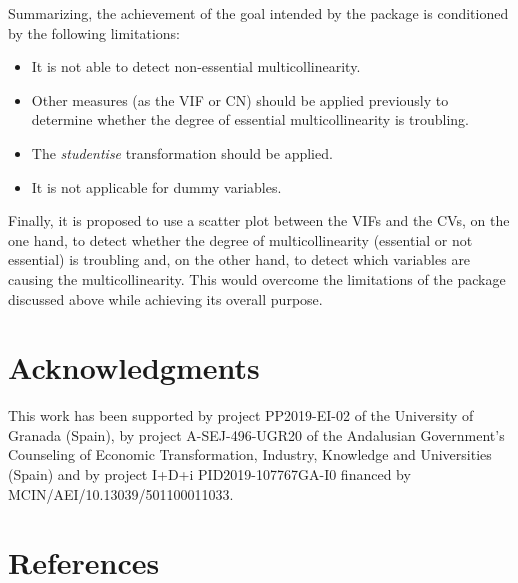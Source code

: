 Summarizing, the achievement of the goal intended by the  package is conditioned by the following limitations:

\begin{itemize}
\tightlist
\item
  It is not able to detect non-essential multicollinearity.
\item
  Other measures (as the VIF or CN) should be applied previously to determine whether the degree of essential multicollinearity is troubling.
\item
  The \emph{studentise} transformation should be applied.
\item
  It is not applicable for dummy variables.
\end{itemize}

Finally, it is proposed to use a scatter plot between the VIFs and the CVs, on the one hand, to detect whether the degree of multicollinearity (essential or not essential) is troubling and, on the other hand, to detect which variables are causing the multicollinearity. This would overcome the limitations of the  package discussed above while achieving its overall purpose.

\hypertarget{acknowledgments}{%
\section{Acknowledgments}\label{acknowledgments}}

This work has been supported by project PP2019-EI-02 of the University of Granada (Spain), by project A-SEJ-496-UGR20 of the Andalusian Government's Counseling of Economic Transformation, Industry, Knowledge and Universities (Spain) and by project I+D+i PID2019-107767GA-I0 financed by MCIN/AEI/10.13039/501100011033.

\hypertarget{references}{%
\section*{References}\label{references}}

